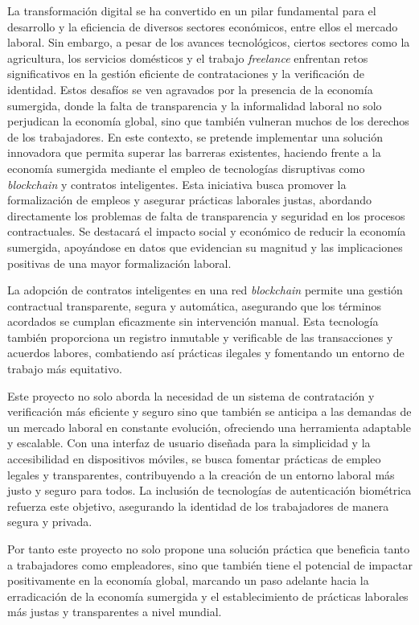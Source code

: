 
La transformación digital se ha convertido en un pilar fundamental para el desarrollo y la eficiencia de diversos sectores económicos, entre ellos el mercado laboral. Sin embargo, a pesar de los avances tecnológicos, ciertos sectores como la agricultura, los servicios domésticos y el trabajo \textit{freelance} enfrentan retos significativos en la gestión eficiente de contrataciones y la verificación de identidad.
Estos desafíos se ven agravados por la presencia de la economía sumergida, donde la falta de transparencia y la informalidad laboral no solo perjudican la economía global, sino que también vulneran muchos de los derechos de los trabajadores.
En este contexto, se pretende implementar una solución innovadora que permita superar las barreras existentes, haciendo frente a la economía sumergida mediante el empleo de tecnologías disruptivas como \textit{blockchain} y contratos inteligentes. Esta iniciativa busca promover la formalización de empleos y asegurar prácticas laborales justas, abordando directamente los problemas de falta de transparencia y seguridad en los procesos contractuales. Se destacará el impacto social y económico de reducir la economía sumergida, apoyándose en datos que evidencian su magnitud y las implicaciones positivas de una mayor formalización laboral.

La adopción de contratos inteligentes en una red \textit{blockchain} permite una gestión contractual transparente, segura y automática, asegurando que los términos acordados se cumplan eficazmente sin intervención manual.
Esta tecnología también proporciona un registro inmutable y verificable de las transacciones y acuerdos labores, combatiendo así prácticas ilegales y fomentando un entorno de trabajo más equitativo.

Este proyecto no solo aborda la necesidad de un sistema de contratación y verificación más eficiente y seguro sino que también se anticipa a las demandas de un mercado laboral en constante evolución, ofreciendo una herramienta adaptable y escalable. Con una interfaz de usuario diseñada para la simplicidad y la accesibilidad en dispositivos móviles, se busca fomentar prácticas de empleo legales y transparentes, contribuyendo a la creación de un entorno laboral más justo y seguro para todos.
La inclusión de tecnologías de autenticación biométrica refuerza este objetivo, asegurando la identidad de los trabajadores de manera segura y privada.

Por tanto este proyecto no solo propone una solución práctica que beneficia tanto a trabajadores como empleadores, sino que también tiene el potencial de impactar positivamente en la economía global, marcando un paso adelante hacia la erradicación de la economía sumergida y el establecimiento de prácticas laborales más justas y transparentes a nivel mundial.